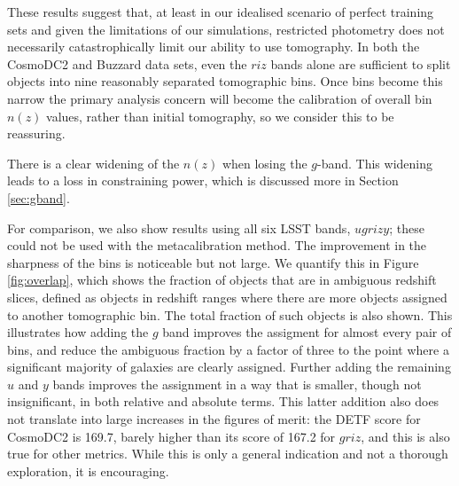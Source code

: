\documentclass[twocolumn,twocolappendix]{aastex63}
\begin{document}
These results suggest that, at least in our idealised scenario of perfect training sets and given the limitations of our simulations, restricted photometry does not necessarily catastrophically limit our ability to use tomography.
In both the CosmoDC2 and Buzzard data sets,
even the $riz$ bands alone are sufficient to split objects into nine reasonably separated
tomographic bins.  Once bins become this narrow the primary analysis concern will become the calibration 
of overall bin $n(z)$ values, rather than initial tomography, so we consider this to be reassuring.

There is a clear widening of the $n(z)$ when losing the $g$-band.  This widening leads to a loss in 
constraining power, which is discussed more in Section \ref{sec:gband}.

For comparison, we also show results using all six LSST bands, $ugrizy$; these could not be used
with the metacalibration method. The improvement in the sharpness of the bins is noticeable but not large.
We quantify this in Figure \ref{fig:overlap}, which shows the fraction of objects that are in ambiguous
redshift slices, defined as objects in redshift ranges where there are more objects assigned to another 
tomographic bin.  The total fraction of such objects is also shown. This illustrates how adding the $g$ band 
improves the assigment
for almost every pair of bins, and reduce the ambiguous fraction by a factor of three to the 
point where a significant majority of galaxies are clearly assigned.  Further adding the remaining $u$ and $y$
bands improves the assignment in a way that is smaller, though not insignificant, in both relative and absolute terms.
This latter addition also does not translate into large increases in the figures of merit: the 
DETF score for CosmoDC2 is 169.7, barely higher than its score of 167.2 for $griz$, and this is also true for other 
metrics.   While this is only a general indication and not a thorough exploration, it is encouraging.
\end{document}
